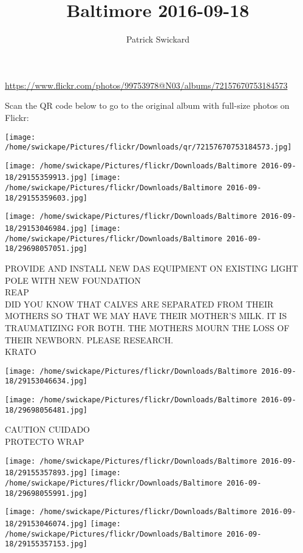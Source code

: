 \documentclass[10pt,letterpaper]{article}
\title{Baltimore 2016-09-18}
\author{Patrick Swickard}
\date{}
\begin{document}
\maketitle

\url{https://www.flickr.com/photos/99753978@N03/albums/72157670753184573}

Scan the QR code below to go to the original album with full-size photos on Flickr:

\texttt{[image: /home/swickape/Pictures/flickr/Downloads/qr/72157670753184573.jpg]}
\pagebreak

\texttt{[image: /home/swickape/Pictures/flickr/Downloads/Baltimore 2016-09-18/29155359913.jpg]}
\texttt{[image: /home/swickape/Pictures/flickr/Downloads/Baltimore 2016-09-18/29155359603.jpg]}

\texttt{[image: /home/swickape/Pictures/flickr/Downloads/Baltimore 2016-09-18/29153046984.jpg]}
\texttt{[image: /home/swickape/Pictures/flickr/Downloads/Baltimore 2016-09-18/29698057051.jpg]}

PROVIDE AND INSTALL NEW DAS EQUIPMENT ON EXISTING LIGHT POLE WITH NEW FOUNDATION\\
REAP\\
DID YOU KNOW THAT CALVES ARE SEPARATED FROM THEIR MOTHERS SO THAT WE MAY HAVE THEIR MOTHER'S MILK.  IT IS TRAUMATIZING FOR BOTH.  THE MOTHERS MOURN THE LOSS OF THEIR NEWBORN.  PLEASE RESEARCH.\\
KRATO
\pagebreak

\texttt{[image: /home/swickape/Pictures/flickr/Downloads/Baltimore 2016-09-18/29153046634.jpg]}

\vspace{0.25in}
\texttt{[image: /home/swickape/Pictures/flickr/Downloads/Baltimore 2016-09-18/29698056481.jpg]}

CAUTION CUIDADO\\
PROTECTO WRAP
\pagebreak

\texttt{[image: /home/swickape/Pictures/flickr/Downloads/Baltimore 2016-09-18/29155357893.jpg]}
\texttt{[image: /home/swickape/Pictures/flickr/Downloads/Baltimore 2016-09-18/29698055991.jpg]}

\texttt{[image: /home/swickape/Pictures/flickr/Downloads/Baltimore 2016-09-18/29153046074.jpg]}
\texttt{[image: /home/swickape/Pictures/flickr/Downloads/Baltimore 2016-09-18/29155357153.jpg]}
\end{document}
